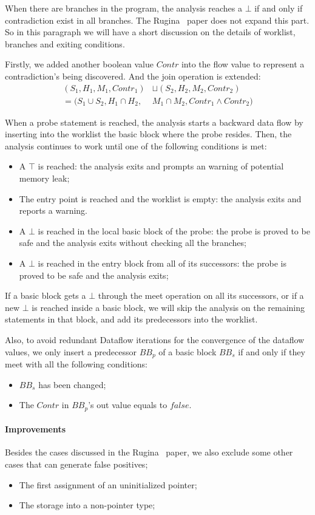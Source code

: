 When there are branches in the program, the analysis reaches a $\bot$ if and only 
if contradiction exist in all branches. The Rugina~\cite{rugina} paper does not 
expand this part. So in this paragraph we will have a 
short discussion on the details of worklist, branches and exiting conditions.

Firstly, we added another boolean value $Contr$ into the flow value to 
represent a contradiction's being discovered. And the join operation is 
extended:
\begin{align*}
  (S_1,H_1,M_1,Contr_1) &\sqcup (S_2,H_2,M_2,Contr_2) \\
  = (S_1\cup S_2,H_1\cap H_2, & M_1\cap M_2,Contr_1\wedge Contr_2)
\end{align*}

When a probe statement is reached, the analysis starts a backward data flow 
by inserting into the worklist the basic block where 
the probe resides. Then, the analysis continues to work until one of the 
following conditions is met:
\begin{itemize}
  \item A $\top$ is reached: the analysis exits and prompts an warning of 
    potential memory leak;
  \item The entry point is reached and the worklist is empty: 
    the analysis exits and reports a warning.
  \item A $\bot$ is reached in the local basic block of the probe: 
    the probe is proved to be safe and the analysis exits without checking all 
    the branches;
  \item A $\bot$ is reached in the entry block from all of its successors:
    the probe is proved to be safe and the analysis exits;
\end{itemize}

If a basic block gets a $\bot$ through the meet operation on all its successors,
or if a new $\bot$ is reached inside a basic block, we will skip the analysis on 
the remaining statements in that block, and add its predecessors into the 
worklist.

Also, to avoid redundant Dataflow iterations for the convergence of the dataflow 
values, we only insert a predecessor $BB_p$ of a basic block $BB_s$ if and only if 
they meet with all the following conditions:
\begin{itemize}
  \item $BB_s$ has been changed;
  \item The $Contr$ in $BB_p$'s out value equals to $false$.
\end{itemize}


\paragraph{Improvements}

Besides the cases discussed in the Rugina~\cite{rugina} paper, we also exclude 
some other cases that can generate false positives;

\begin{itemize}
  \item The first assignment of an uninitialized pointer;
  \item The storage into a non-pointer type;
\end{itemize}
